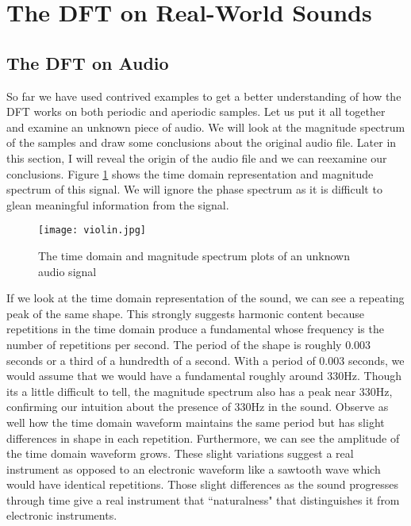 \section*{The DFT on Real-World Sounds}

\subsection*{The DFT on Audio}

So far we have used contrived examples to get a better understanding of how the DFT works on both periodic and
aperiodic samples.  Let us put it all together and examine an unknown piece of audio.  We will look at the magnitude
spectrum of the samples and draw some conclusions about the original audio file.  Later in this section, I
will reveal the origin of the audio file and we can reexamine our conclusions.  Figure \ref{fig:unknown} shows the 
time domain representation and magnitude spectrum of this signal.  We will ignore the phase spectrum as it
is difficult to glean meaningful information from the signal.

\begin{figure}[h]
	\caption{The time domain and magnitude spectrum plots of an unknown audio signal}
	\label{fig:unknown}
	\begin{center}
		\texttt{[image: violin.jpg]}
	\end{center}
\end{figure}

If we look at the time domain representation of the sound, we can see a repeating peak of the same shape.  This
strongly suggests harmonic content because repetitions in the time domain produce a fundamental whose
frequency is the number of repetitions per second.  The period of the shape is roughly 0.003 seconds or a third of
a hundredth of a second.  With a period of 0.003 seconds, we would assume that we would have a fundamental
roughly around 330Hz.  Though its a little difficult to tell, the magnitude spectrum also has a peak near 330Hz, 
confirming our intuition about the presence of 330Hz in the sound.  Observe as well how the time domain
waveform maintains the same period but has slight differences in shape in each repetition.  Furthermore, we
can see the amplitude of the time domain waveform grows.  These
slight variations suggest a real instrument as opposed to an electronic waveform like a sawtooth wave which
would have identical repetitions.  Those slight differences as the sound progresses through time give a real
instrument that ``naturalness" that distinguishes it from electronic instruments.

